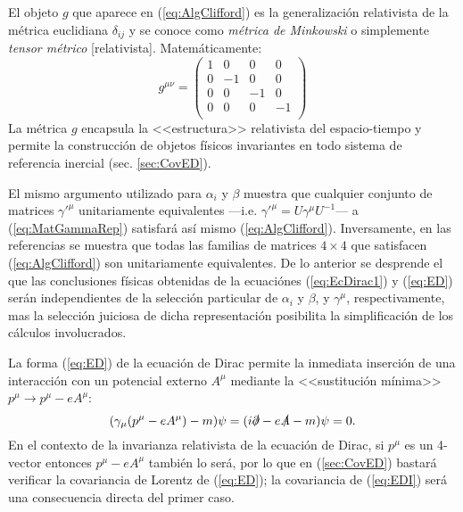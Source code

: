 
El objeto $g$ que aparece en (\ref{eq:AlgClifford}) es la generalización relativista de la métrica euclidiana $\delta_{i j}$ y se conoce como \textit{métrica de Minkowski} o simplemente \textit{tensor métrico} [relativista]. Matemáticamente:
\begin{equation}%
g^{\mu\nu}=	\begin{pmatrix}
			1 & 0 & 0 & 0 \\
			0 & -1 & 0 & 0 \\
			0 & 0 & -1 & 0 \\
			0 & 0 & 0 & -1 \\
			\end{pmatrix}
\end{equation}
La métrica $g$ encapsula la <<estructura>> relativista del espacio-tiempo y permite la construcción de objetos físicos invariantes en todo sistema de referencia inercial (sec. \ref{sec:CovED}).

El mismo argumento utilizado para $\alpha_i$ y $\beta$ muestra que cualquier conjunto de matrices ${\gamma'}^{\mu}$ unitariamente equivalentes ---i.e. ${\gamma'}^{\mu}= U\gamma^{\mu}U^{-1}$--- a (\ref{eq:MatGammaRep}) satisfará así mismo (\ref{eq:AlgClifford}). Inversamente, en las referencias \cite{Good,GreinerRQM} se muestra que todas las familias de matrices $4\times 4$ que satisfacen (\ref{eq:AlgClifford}) son unitariamente equivalentes. De lo anterior se desprende el que las conclusiones físicas obtenidas de la ecuaciónes (\ref{eq:EcDirac1}) y (\ref{eq:ED}) serán independientes de la selección particular de $\alpha_i$ y $\beta$, y $\gamma^{\mu}$, respectivamente, mas la selección juiciosa de dicha representación posibilita la simplificación de los cálculos involucrados.

La forma (\ref{eq:ED}) de la ecuación de Dirac permite la inmediata inserción de una interacción con un potencial externo $A^{\mu}$ mediante la <<sustitución mínima>> $p^{\mu}\rightarrow p^{\mu}-eA^{\mu}$:\footnotemark
\begin{equation}\label{eq:EDI}
	(\gamma_{\mu}(p^{\mu}-eA^{\mu})-m)\psi=(i\slashed{\partial}-e\slashed{A}-m)\psi=0.
\end{equation}
En el contexto de la invarianza relativista de la ecuación de Dirac, si $p^{\mu}$ es un 4-vector entonces $p^{\mu}-eA^{\mu}$ también lo será, por lo que en (\ref{sec:CovED}) bastará verificar la covariancia de Lorentz de (\ref{eq:ED}); la covariancia de (\ref{eq:EDI}) será una consecuencia directa del primer caso. 

